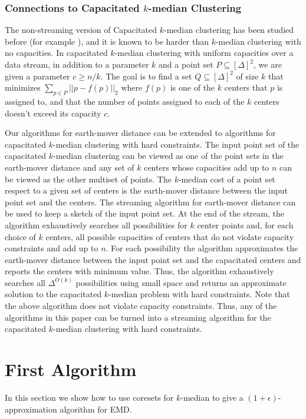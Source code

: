 \documentclass[oribibl]{llncs}
\begin{document}
\subsubsection{Connections to Capacitated $k$-median Clustering}
The non-streaming version of Capacitated $k$-median clustering
has been studied before (for example \cite{cap_kmedian1, cap_facil}),
and it is known to be harder than $k$-median clustering with no capacities.
In capacitated $k$-median clustering with uniform capacities over
a data stream, in addition to a parameter $k$ and a point set
$P\subseteq[\Delta]^2$, we are given a parameter $c \ge n/k$.
The goal is to find a set $Q\subseteq [\Delta]^2$ of size $k$ that minimizes
$\sum_{p\in P} ||p-f(p)||_2$ where $f(p)$ is one of the $k$ centers
that $p$ is assigned to, and that the number of points
assigned to each of the $k$ centers doesn't exceed its capacity $c$.

Our algorithms for earth-mover distance can be extended to algorithms for
capacitated $k$-median clustering with hard constraints.
The input point set of the capacitated $k$-median clustering can be viewed
as one of the point sets in the earth-mover distance and any set
of $k$ centers whose capacities add up to $n$ can be viewed as
the other multiset of points.
The $k$-median cost of a point set respect to a given set of centers
is the earth-mover distance between the input point set and the centers.
The streaming algorithm for earth-mover distance can be used
to keep a sketch of the input point set. At the end of the stream,
the algorithm exhaustively searches all possibilities for $k$ center points and,
for each choice of $k$ centers, all possible capacities of centers that do
not violate capacity constraints and add up to $n$.
For each possibility the algorithm approximates the
earth-mover distance between the input point set and the capacitated centers
and reports the centers with minimum value. Thus, the algorithm
exhaustively searches all $\Delta ^{O(k)}$ possibilities using small space
and returns an approximate solution
to the capacitated $k$-median problem with hard constraints.
Note that the above algorithm does not violate capacity constraints.
Thus, any of the algorithms in this paper can be turned into a streaming
algorithm for the capacitated $k$-median clustering with hard constraints.

\section{First Algorithm}
 In this section we show how to use coresets for $k$-median to give
a $(1+\epsilon)$-approximation algorithm for EMD.
 
\end{document}
